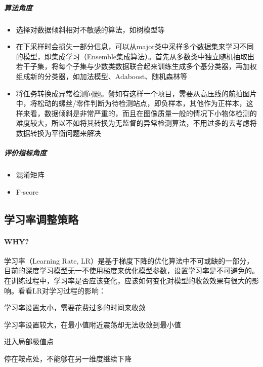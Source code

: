 \subparagraph{算法角度}
\begin{itemize}
	\item 选择对数据倾斜相对不敏感的算法，如树模型等
	\item 在下采样时会损失一部分信息，可以从major类中采样多个数据集来学习不同的模型，即集成学习（Ensemble集成算法）。首先从多数类中独立随机抽取出若干子集，将每个子集与少数类数据联合起来训练生成多个基分类器，再加权组成新的分类器，如加法模型、Adaboost、随机森林等
	\item 将任务转换成异常检测问题。譬如有这样一个项目，需要从高压线的航拍图片中，将松动的螺丝/零件判断为待检测站点，即负样本，其他作为正样本，这样来看，数据倾斜是非常严重的，而且在图像质量一般的情况下小物体检测的难度较大，所以不如将其转换为无监督的异常检测算法，不用过多的去考虑将数据转换为平衡问题来解决
\end{itemize}

\subparagraph{评价指标角度}
\begin{itemize}
	\item 混淆矩阵
	\item F-score
\end{itemize}

\subsection{学习率调整策略}
\paragraph{WHY?}学习率（Learning Rate, LR）是基于梯度下降的优化算法中不可或缺的一部分，目前的深度学习模型无一不使用梯度来优化模型参数，设置学习率是不可避免的。在训练过程中，学习率是否应该变化，应该如何变化对模型的收敛效果有很大的影响。看看LR对学习过程的影响：
\begin{myitemize}
	\item 学习率设置太小，需要花费过多的时间来收敛
	\item 学习率设置较大，在最小值附近震荡却无法收敛到最小值
	\item 进入局部极值点
	\item 停在鞍点处，不能够在另一维度继续下降
\end{myitemize}

